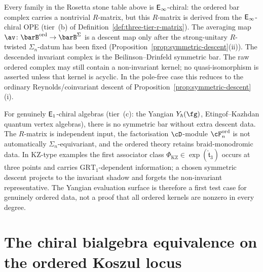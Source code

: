 \begin{remark}
\label{rem:ordered-neq-symmetric}
Every family in the Rosetta stone table above is
$\mathsf{E}_{\infty}$-chiral: the ordered bar complex carries a nontrivial
$R$-matrix, but this $R$-matrix is derived from the
$\mathsf{E}_{\infty}$-chiral OPE (tier~(b) of
Definition~\ref{def:three-tier-r-matrix}). The averaging map
$\av \colon \barB^{\mathrm{ord}} \to \barB^\Sigma$ is a
descent map only after the strong-unitary $R$-twisted
$\Sigma_n$-datum has been fixed
(Proposition~\ref{prop:symmetric-descent}(ii)). The descended
invariant complex is the Beilinson--Drinfeld symmetric bar. The raw
ordered complex may still contain a non-invariant kernel; no
quasi-isomorphism is asserted unless that kernel is acyclic. In the
pole-free case this reduces to the ordinary Reynolds/coinvariant
descent of Proposition~\ref{prop:symmetric-descent}(i).

For genuinely $\mathsf{E}_1$-chiral algebras (tier~(c): the Yangian
$Y_\hbar(\fg)$, Etingof--Kazhdan quantum vertex algebras),
there is no symmetric bar without extra descent data. The
$R$-matrix is independent input, the factorisation $\cD$-module
$\cF_n^{\mathrm{ord}}$ is not automatically $\Sigma_n$-equivariant,
and the ordered theory retains braid-monodromic data. In KZ-type
examples the first associator class
$\Phi_{\mathrm{KZ}} \in \exp(\hat{\mathfrak{t}}_3)$ occurs at
three points and carries $\mathrm{GRT}_1$-dependent information; a
chosen symmetric descent projects to the invariant shadow and
forgets the non-invariant representative. The Yangian evaluation
surface is therefore a first test case for genuinely ordered data, not
a proof that all ordered kernels are nonzero in every degree.
\end{remark}



\section{The chiral bialgebra equivalence on the ordered Koszul locus}
\label{sec:chiral-quantum-group-equiv}


